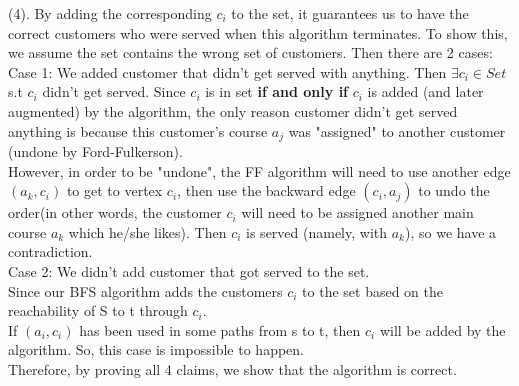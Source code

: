\documentclass{assignment-373}
\begin{document}
\begin{enumerate}
    (4). By adding the corresponding $c_i$ to the set, it guarantees us to have the correct customers who were served when this algorithm terminates. To show this, we assume the set contains the wrong set of customers. Then there are 2 cases:\\
    \phantom{=} \phantom{=} Case 1: We added customer that didn't get served with anything. Then $\exists c_i \in Set$ s.t $c_i$ didn't get served. Since $c_i$ is in set \textbf{if and only if} $c_i$ is added (and later augmented) by the algorithm, the only reason customer didn't get served anything is because this customer's course $a_j$ was "assigned" to another customer (undone by Ford-Fulkerson).\\
    \phantom{=} \phantom{=} However, in order to be "undone", the FF algorithm will need to use another edge $(a_k, c_i)$ to get to vertex $c_i$, then use the backward edge $(c_i, a_j)$ to undo the order(in other words, the customer $c_i$ will need to be assigned another main course $a_k$ which he/she likes). Then $c_i$ is served (namely, with $a_k$), so we have a contradiction.\\
    \phantom{=} \phantom{=} Case 2: We didn't add customer that got served to the set.\\
    \phantom{=} \phantom{=} Since our BFS algorithm adds the customers $c_i$ to the set based on the reachability of S to t through $c_i$.\\
    \phantom{=} \phantom{=} If $(a_i, c_i)$ has been used in some paths from s to t, then $c_i$ will be added by the algorithm. So, this case is impossible to happen.\\
    
    Therefore, by proving all 4 claims, we show that the algorithm is correct.\\
    

\end{enumerate}
\end{document}
